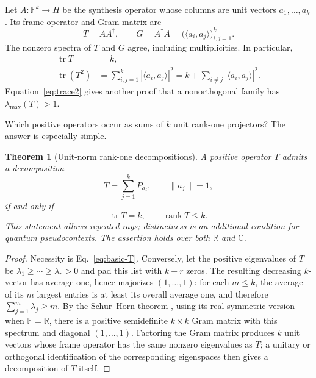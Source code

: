 \documentclass[
  twocolumn,
  aps,
  pra,
  floatfix,
  amsmath,amssymb,
  longbibliography
]{revtex4-2}
\newtheorem{theorem}{Theorem}
\theoremstyle{definition}
\theoremstyle{remark}
\newcommand{\R}{\mathbb R}
\newcommand{\C}{\mathbb C}
\newcommand{\F}{\mathbb F}
\newcommand{\Tr}{\operatorname{tr}}
\newcommand{\1}{\mathbf 1}
\begin{document}
Let $A:\F^k\to H$ be the synthesis operator whose columns are unit vectors
$a_1,\ldots,a_k$.  Its frame operator and Gram matrix are
\begin{equation}
 T=AA^\dagger,\qquad G=A^\dagger A
   =\bigl(\langle a_i,a_j\rangle\bigr)_{i,j=1}^{k}.
 \label{eq:frame-gram}
\end{equation}
The nonzero spectra of $T$ and $G$ agree, including multiplicities.  In
particular,
\begin{align}
 \Tr T&=k,\label{eq:trace1}\\
 \Tr(T^2)&=\sum_{i,j=1}^{k}|\langle a_i,a_j\rangle|^2
 =k+\sum_{i\ne j}|\langle a_i,a_j\rangle|^2.
 \label{eq:trace2}
\end{align}
Equation~\eqref{eq:trace2} gives another proof that a nonorthogonal family has
$\lambda_{\max}(T)>1$.

Which positive operators occur as sums of $k$ unit rank-one projectors?  The
answer is especially simple.

\begin{theorem}[Unit-norm rank-one decompositions]
\label{thm:schur-horn}
A positive operator $T$ admits a decomposition
\begin{equation}
 T=\sum_{j=1}^{k}P_{a_j},\qquad \|a_j\|=1,
 \label{eq:unit-decomposition}
\end{equation}
if and only if
\begin{equation}
 \Tr T=k,\qquad \operatorname{rank}T\le k.
 \label{eq:schur-condition}
\end{equation}
This statement allows repeated rays; distinctness is an additional condition
for quantum pseudocontexts.  The assertion holds over both $\R$ and $\C$.
\end{theorem}

\begin{proof}
Necessity is Eq.~\eqref{eq:basic-T}.  Conversely, let the positive eigenvalues
of $T$ be $\lambda_1\ge\cdots\ge\lambda_r>0$ and pad this list with $k-r$
zeros.  The resulting decreasing $k$-vector has average one, hence majorizes
$(1,\ldots,1)$: for each $m\le k$, the average of its $m$ largest
entries is at least its overall average one, and therefore
$\sum_{j=1}^{m}\lambda_j\ge m$.  By the Schur--Horn theorem
\cite{Horn-Johnson-MatrixAnalysis}, using its real symmetric version when
$\F=\R$, there is a positive semidefinite
$k\times k$ Gram matrix with this spectrum and diagonal $(1,\ldots,1)$.
Factoring the Gram matrix produces $k$ unit vectors whose frame operator has
the same nonzero eigenvalues as $T$; a unitary or orthogonal identification
of the corresponding eigenspaces then gives a decomposition of $T$ itself.
\end{proof}
\end{document}

